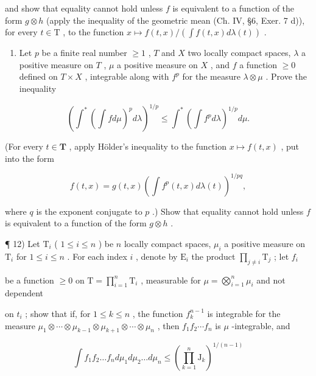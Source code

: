 and show that equality cannot hold unless \(f\) is equivalent to a function of the form \(g \otimes h\) (apply the inequality of the geometric mean (Ch. IV, §6, Exer. 7 d)), for every \(t \in \mathrm{T}\) , to the function \(x \mapsto f(t,x) / (\int f(t,x)d\lambda (t))\) .

\begin{enumerate}
\def\labelenumi{\arabic{enumi})}
\setcounter{enumi}{10}
\tightlist
\item
  Let \(p\) be a finite real number \(\geqslant 1\) , \(T\) and \(X\) two locally compact spaces, \(\lambda\) a positive measure on \(T\) , \(\mu\) a positive measure on \(X\) , and \(f\) a function \(\geqslant 0\) defined on \(T \times X\) , integrable along with \(f^p\) for the measure \(\lambda \otimes \mu\) . Prove the inequality
\end{enumerate}

\[
\left(\int^ {*} \left(\int f d \mu\right) ^ {p} d \lambda\right) ^ {1 / p} \leqslant \int^ {*} \left(\int f ^ {p} d \lambda\right) ^ {1 / p} d \mu .
\]

(For every \(t \in \mathbf{T}\) , apply Hölder's inequality to the function \(x \mapsto f(t, x)\) , put into the form

\[
f (t, x) = g (t, x) \left(\int f ^ {p} (t, x) d \lambda (t)\right) ^ {1 / p q},
\]

where \(q\) is the exponent conjugate to \(p\) .) Show that equality cannot hold unless \(f\) is equivalent to a function of the form \(g \otimes h\) .

¶ 12) Let \(\mathrm{T}_i\) ( \(1 \leqslant i \leqslant n\) ) be \(n\) locally compact spaces, \(\mu_i\) a positive measure on \(\mathrm{T}_i\) for \(1 \leqslant i \leqslant n\) . For each index \(i\) , denote by \(\mathrm{E}_i\) the product \(\prod_{j \neq i} \mathrm{T}_j\) ; let \(f_i\)

be a function \(\geqslant 0\) on \(\mathrm{T} = \prod_{i=1}^{n} \mathrm{T}_i\) , measurable for \(\mu = \bigotimes_{i=1}^{n} \mu_i\) and not dependent

on \(t_{i}\) ; show that if, for \(1 \leqslant k \leqslant n\) , the function \(f_{k}^{n-1}\) is integrable for the measure \(\mu_{1} \otimes \cdots \otimes \mu_{k-1} \otimes \mu_{k+1} \otimes \cdots \otimes \mu_{n}\) , then \(f_{1}f_{2} \cdots f_{n}\) is \(\mu\) -integrable, and

\[
\int f _ {1} f _ {2} \dots f _ {n} d \mu_ {1} d \mu_ {2} \dots d \mu_ {n} \leqslant \left(\prod_ {k = 1} ^ {n} \mathrm{J} _ {k}\right) ^ {1 / (n - 1)}
\]

